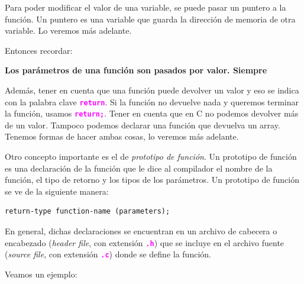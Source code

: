\documentclass[]{scrartcl}
\newcommand{\hl}[1]{\textcolor{magenta}{\textbf{\texttt{#1}}}}
\begin{document}
Para poder modificar el valor de una variable, se puede pasar un puntero a la función. Un puntero es una variable que guarda la dirección de memoria de otra variable. Lo veremos más adelante.

Entonces recordar:

\begin{importantbox}
  \centering
  \textbf{Los parámetros de una función son pasados por valor. Siempre}
\end{importantbox}

Además, tener en cuenta que una función puede devolver un valor y eso se indica con la palabra clave \hl{return}. Si la función no devuelve nada y queremos terminar la función, usamos \hl{return;}. Tener en cuenta que en C no podemos devolver más de un valor. Tampoco podemos declarar una función que devuelva un array. Tenemos formas de hacer ambas cosas, lo veremos más adelante.

Otro concepto importante es el de \textit{prototipo de función}. Un prototipo de función es una declaración de la función que le dice al compilador el nombre de la función, el tipo de retorno y los tipos de los parámetros. Un prototipo de función se ve de la siguiente manera:

\begin{center}
  \begin{Verbatim}[fontshape=it]
  return-type function-name (parameters);
  \end{Verbatim}
\end{center}

En general, dichas declaraciones se encuentran en un archivo de cabecera o encabezado (\textit{header file}, con extensión \hl{.h}) que se incluye en el archivo fuente (\textit{source file}, con extensión \hl{.c}) donde se define la función.

Veamos un ejemplo:
\end{document}
